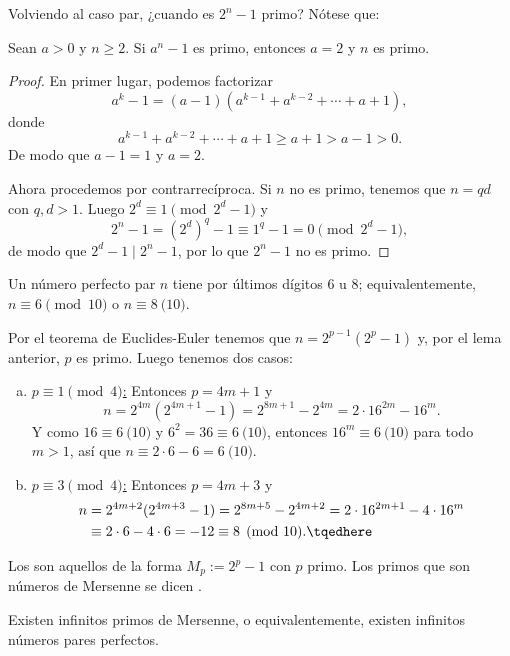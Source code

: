 \documentclass[teoria-numeros.tex]{subfiles}
\begin{document}
Volviendo al caso par, ¿cuando es $2^n - 1$ primo? Nótese que:
\begin{prop}
	Sean $a > 0$ y $n\ge 2$.
	Si $a^n - 1$ es primo, entonces $a = 2$ y $n$ es primo.
\end{prop}
\begin{proof}
	En primer lugar, podemos factorizar
	$$ a^k - 1 = (a - 1)(a^{k-1} + a^{k-2} + \cdots + a + 1), $$
	donde
	$$ a^{k-1} + a^{k-2} + \cdots + a + 1 \ge a + 1 > a - 1 > 0. $$
	De modo que $a - 1 = 1$ y $a = 2$.

	Ahora procedemos por contrarrecíproca.
	Si $n$ no es primo, tenemos que $n = qd$ con $q, d > 1$.
	Luego $2^d \equiv 1 \pmod{2^d - 1}$ y
	\[
		2^n - 1 = (2^d)^q - 1 \equiv 1^q - 1 = 0 \pmod{2^d - 1},
	\]
	de modo que $2^d - 1 \mid 2^n - 1$, por lo que $2^n - 1$ no es primo.
\end{proof}

\begin{prob}
	Un número perfecto par $n$ tiene por últimos dígitos 6 u 8;
	equivalentemente, $n \equiv 6 \pmod{10}$ o $n \equiv 8 \pod{10}$.
\end{prob}
\begin{sol}
	Por el teorema de Euclides-Euler tenemos que $n = 2^{p-1}(2^p - 1)$ y, por el lema anterior, $p$ es primo.
	Luego tenemos dos casos:
	\begin{enumerate}[(a)]
		\item \underline{$p \equiv 1 \pmod{4}$:}
			Entonces $p = 4m+1$ y
			$$ n = 2^{4m}(2^{4m+1} - 1) = 2^{8m+1} - 2^{4m} = 2\cdot 16^{2m} - 16^m. $$
			Y como $16 \equiv 6 \pod{10}$ y $6^2 = 36 \equiv 6 \pod{10}$, entonces $16^m \equiv 6 \pod{10}$ para todo $m > 1$,
			así que $n \equiv 2\cdot 6 - 6 = 6 \pod{10}$.

		\item \underline{$p \equiv 3 \pmod{4}$:}
			Entonces $p = 4m + 3$ y
			\begin{align}
				n &= 2^{4m+2}(2^{4m+3} - 1) = 2^{8m + 5} - 2^{4m + 2} = 2\cdot 16^{2m + 1} - 4 \cdot 16^m \notag \\
				  &\equiv 2 \cdot 6 - 4\cdot 6 = -12 \equiv 8 \pmod{10}. \tqedhere
			\end{align}
	\end{enumerate}
\end{sol}

\begin{mydef}
	Los  son aquellos de la forma $M_p := 2^p - 1$ con $p$ primo.
	Los primos que son números de Mersenne se dicen .
\end{mydef}
\begin{con}
	Existen infinitos primos de Mersenne, o equivalentemente, existen infinitos números pares perfectos.
\end{con}
\end{document}
